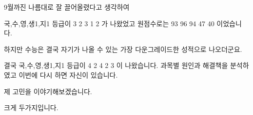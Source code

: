 9월까진 나름대로 잘 끌어올렸다고 생각하여
\vspace{5mm}

국,수,영,생1,지1 등급이 3 2 3 1 2 가 나왔었고 원점수로는 93 96 94 47 40 이었습니다.
\vspace{5mm}

하지만 수능은 결국 자기가 나올 수 있는 가장 다운그레이드한 성적으로 나오더군요.
\vspace{5mm}

결국 국,수,영,생1,지1 등급이 4 2 4 2 3 이 나왔습니다. 과목별 원인과 해결책을 분석하였고 이번에 다시 하면 자신이 있습니다.
\vspace{5mm}

제 고민을 이야기해보겠습니다.
\vspace{5mm}

크게 두가지입니다.
\vspace{5mm}
